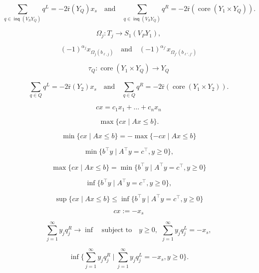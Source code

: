 \documentclass[10pt, reqno]{article}
\begin{document}
\begin{equation}\label{l2i2}
\sum_{q \in  \operatorname{\textsf{inq}}( V_S Y_Q)}^{}q^L = - 2{\bar {\mathrm{r}}}(Y_Q) x_s \quad  \mbox{and}   \quad
\sum_{q \in  \operatorname{\textsf{inq}}(V_S Y_Q)}^{}q^R = - 2 {\bar {\mathrm{r}}}(\operatorname{core}(Y_1  \times  Y_Q))   .
\end{equation}

$$
{\Omega}_j : T_j \to S_1( V_P Y_1) ,
$$

$$
(-1)^{{\alpha}_j}x_{ {\Omega}_j(b_{\ell,j})} \quad \mbox{and} \quad  (-1)^{{\alpha}_{j'}}x_{ {\Omega}_{j'}(b_{\ell',j'})}
$$

$$
\tau_Q : \operatorname{core}(  Y_1  \times  Y_Q ) \to Y_Q
$$

\begin{equation*}\label{l2i1}
\sum_{q \in Q}^{}q^L   =    -2{\bar {\mathrm{r}}}(Y_2) x_s \quad  \mbox{and}   \quad
\sum_{q \in  Q}^{  }q^R = - 2{\bar {\mathrm{r}}}(\operatorname{core}(Y_1  \times  Y_2))   .
\end{equation*}

$$
cx= c_1x_1+\dots +c_nx_n
$$

$$
\max\{ cx \mid Ax \le b  \} .
$$

$$
 \min\{ cx \mid Ax \le b    \} = -  \max\{ -cx \mid Ax \le b    \}
 $$

$$
 \min\{ b^{\top}y \mid A^{\top}y = c^{\top}, y\ge 0  \} ,
 $$

\begin{equation}\label{dt}
\max\{ cx \mid Ax \le b    \}  =  \min\{ b^{\top}y \mid A^{\top}y = c^{\top}, y\ge 0  \}
\end{equation}

$$
\inf \{ b^{\top}y \mid A^{\top}y = c^{\top}, y\ge 0  \} ,
$$

\begin{equation}\label{dtt}
\sup \{ cx \mid Ax \le b    \}  \le   \inf \{ b^{\top}y \mid A^{\top}y = c^{\top}, y\ge 0  \}
\end{equation}

$$cx :=  -x_s$$

\begin{equation}\label{dlpp}
\sum_{j=1}^{\infty } y_j q_j^R \to \inf  \quad  \mbox{subject to} \quad   y \ge 0 , \  \
\sum_{j=1}^{\infty } y_j q_j^L = - x_s ,
\end{equation}

\begin{equation}\label{dlp}
\inf \{ \sum_{j=1}^{\infty} y_j q_j^R \mid  \sum_{j=1}^{\infty} y_j q_j^L = - x_s , y \ge 0  \} .
\end{equation}
\end{document}
